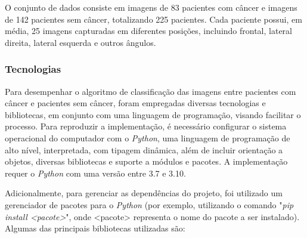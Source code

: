 O conjunto de dados consiste em imagens de 83 pacientes com câncer e imagens de 142 pacientes sem câncer, totalizando 225 pacientes. Cada paciente possui, em média, 25 imagens capturadas em diferentes posições, incluindo frontal, lateral direita, lateral esquerda e outros ângulos.



\subsubsection{\esp Tecnologias} \label{techs}
Para desempenhar o algoritmo de classificação das imagens entre pacientes com câncer e pacientes sem câncer, foram empregadas diversas tecnologias e bibliotecas, em conjunto com uma linguagem de programação, visando facilitar o processo. Para reproduzir a implementação, é necessário configurar o sistema operacional do computador com o \textit{Python}, uma linguagem de programação de alto nível, interpretada, com tipagem dinâmica, além de incluir orientação a objetos, diversas bibliotecas e suporte a módulos e pacotes. A implementação requer o \textit{Python} com uma versão entre 3.7 e 3.10.


Adicionalmente, para gerenciar as dependências do projeto, foi utilizado um gerenciador de pacotes para o \textit{Python} (por exemplo, utilizando o comando "\textit{pip install <pacote>}", onde <pacote> representa o nome do pacote a ser instalado). Algumas das principais bibliotecas utilizadas são:

